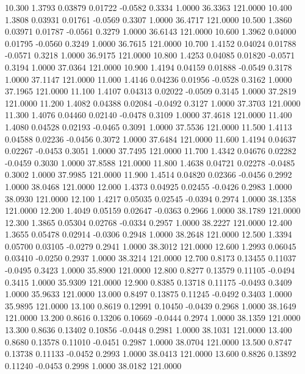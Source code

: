   10.300   1.3793   0.03879   0.01722  -0.0582   0.3334   1.0000  36.3363 121.0000
  10.400   1.3808   0.03931   0.01761  -0.0569   0.3307   1.0000  36.4717 121.0000
  10.500   1.3860   0.03971   0.01787  -0.0561   0.3279   1.0000  36.6143 121.0000
  10.600   1.3962   0.04000   0.01795  -0.0560   0.3249   1.0000  36.7615 121.0000
  10.700   1.4152   0.04024   0.01788  -0.0571   0.3218   1.0000  36.9175 121.0000
  10.800   1.4253   0.04085   0.01820  -0.0571   0.3194   1.0000  37.0364 121.0000
  10.900   1.4194   0.04159   0.01888  -0.0549   0.3178   1.0000  37.1147 121.0000
  11.000   1.4146   0.04236   0.01956  -0.0528   0.3162   1.0000  37.1965 121.0000
  11.100   1.4107   0.04313   0.02022  -0.0509   0.3145   1.0000  37.2819 121.0000
  11.200   1.4082   0.04388   0.02084  -0.0492   0.3127   1.0000  37.3703 121.0000
  11.300   1.4076   0.04460   0.02140  -0.0478   0.3109   1.0000  37.4618 121.0000
  11.400   1.4080   0.04528   0.02193  -0.0465   0.3091   1.0000  37.5536 121.0000
  11.500   1.4113   0.04588   0.02236  -0.0456   0.3072   1.0000  37.6484 121.0000
  11.600   1.4194   0.04637   0.02267  -0.0453   0.3051   1.0000  37.7495 121.0000
  11.700   1.4342   0.04676   0.02282  -0.0459   0.3030   1.0000  37.8588 121.0000
  11.800   1.4638   0.04721   0.02278  -0.0485   0.3002   1.0000  37.9985 121.0000
  11.900   1.4514   0.04820   0.02366  -0.0456   0.2992   1.0000  38.0468 121.0000
  12.000   1.4373   0.04925   0.02455  -0.0426   0.2983   1.0000  38.0930 121.0000
  12.100   1.4217   0.05035   0.02545  -0.0394   0.2974   1.0000  38.1358 121.0000
  12.200   1.4049   0.05159   0.02647  -0.0363   0.2966   1.0000  38.1789 121.0000
  12.300   1.3865   0.05304   0.02768  -0.0334   0.2957   1.0000  38.2227 121.0000
  12.400   1.3655   0.05478   0.02914  -0.0306   0.2948   1.0000  38.2648 121.0000
  12.500   1.3394   0.05700   0.03105  -0.0279   0.2941   1.0000  38.3012 121.0000
  12.600   1.2993   0.06045   0.03410  -0.0250   0.2937   1.0000  38.3214 121.0000
  12.700   0.8173   0.13455   0.11037  -0.0495   0.3423   1.0000  35.8900 121.0000
  12.800   0.8277   0.13579   0.11105  -0.0494   0.3415   1.0000  35.9309 121.0000
  12.900   0.8385   0.13718   0.11175  -0.0493   0.3409   1.0000  35.9633 121.0000
  13.000   0.8497   0.13875   0.11245  -0.0492   0.3403   1.0000  35.9895 121.0000
  13.100   0.8619   0.12991   0.10450  -0.0439   0.2968   1.0000  38.1649 121.0000
  13.200   0.8616   0.13206   0.10669  -0.0444   0.2974   1.0000  38.1359 121.0000
  13.300   0.8636   0.13402   0.10856  -0.0448   0.2981   1.0000  38.1031 121.0000
  13.400   0.8680   0.13578   0.11010  -0.0451   0.2987   1.0000  38.0704 121.0000
  13.500   0.8747   0.13738   0.11133  -0.0452   0.2993   1.0000  38.0413 121.0000
  13.600   0.8826   0.13892   0.11240  -0.0453   0.2998   1.0000  38.0182 121.0000
